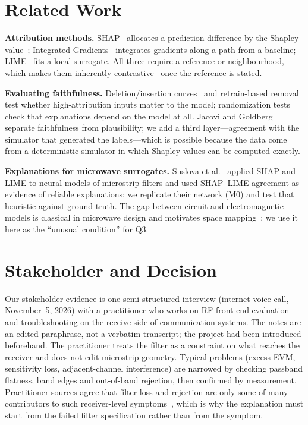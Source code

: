 \documentclass[conference,onecolumn,10pt]{IEEEtran}
\begin{document}
\section{Related Work}
\textbf{Attribution methods.} SHAP~\cite{lundberg2017} allocates a prediction difference by the Shapley value~\cite{shapley1953}; Integrated Gradients~\cite{sundararajan2017} integrates gradients along a path from a baseline; LIME~\cite{ribeiro2016} fits a local surrogate.
All three require a reference or neighbourhood, which makes them inherently contrastive~\cite{lipton1990,miller2019} once the reference is stated.

\textbf{Evaluating faithfulness.} Deletion/insertion curves~\cite{petsiuk2018} and retrain-based removal~\cite{hooker2019} test whether high-attribution inputs matter to the model; randomization tests~\cite{adebayo2018} check that explanations depend on the model at all.
Jacovi and Goldberg~\cite{jacovi2020} separate faithfulness from plausibility; we add a third layer---agreement with the simulator that generated the labels---which is possible because the data come from a deterministic simulator in which Shapley values can be computed exactly.

\textbf{Explanations for microwave surrogates.} Suslova et al.~\cite{suslova2026} applied SHAP and LIME to neural models of microstrip filters and used SHAP--LIME agreement as evidence of reliable explanations; we replicate their network (M0) and test that heuristic against ground truth.
The gap between circuit and electromagnetic models is classical in microwave design and motivates space mapping~\cite{bandler1994}; we use it here as the ``unusual condition'' for Q3.

\section{Stakeholder and Decision}
Our stakeholder evidence is one semi-structured interview (internet voice call, November~5, 2026) with a practitioner who works on RF front-end evaluation and troubleshooting on the receive side of communication systems.
The notes are an edited paraphrase, not a verbatim transcript; the project had been introduced beforehand.
The practitioner treats the filter as a constraint on what reaches the receiver and does not edit microstrip geometry.
Typical problems (excess EVM, sensitivity loss, adjacent-channel interference) are narrowed by checking passband flatness, band edges and out-of-band rejection, then confirmed by measurement.
Practitioner sources agree that filter loss and rejection are only some of many contributors to such receiver-level symptoms~\cite{rs_evm,adi_an1354}, which is why the explanation must start from the failed filter specification rather than from the symptom.
\end{document}
